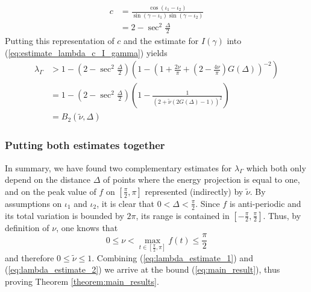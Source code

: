 \documentclass{article}
\begin{document}
\begin{align*}
    c &=  \frac{\cos(\iota_1-\iota_2)}{\sin(\gamma - \iota_1) \sin(\gamma - \iota_2)}\\
    &= 2 - \sec^2 \frac\Delta 2
\end{align*}
Putting this representation of $c$ and the estimate for $I(\gamma)$ into (\ref{eq:estimate_lambda_c_I_gamma}) yields
\begin{align}
    \lambda_\Gamma &> 1 -  \left(2 - \sec^2 \frac\Delta 2\right)\left( 1-\left(1+ \frac{2\nu}\pi+ \left(2 - \frac{4\nu}\pi\right) G(\Delta)\right)^{-2}\right)\nonumber\\
    &= 1 -  \left(2 - \sec^2 \frac\Delta 2\right)\left( 1-\frac{1}{\left(2+\tilde\nu (2G(\Delta)-1)\right)^{2}}\right) \label{eq:lambda_estimate_2}\\
     &= B_2(\tilde\nu, \Delta) \nonumber
\end{align}

\subsubsection*{Putting both estimates together}

In summary, we have found two complementary estimates for $\lambda_\Gamma$ which both only depend on the distance $\Delta$ of points where the energy projection is equal to one, and on the peak value of $f$ on $[\frac\pi2,\pi]$ represented (indirectly) by $\tilde\nu$.
By assumptions on $\iota_1$ and $\iota_2$, it is clear that $0<\Delta<\frac\pi2$.
Since $f$ is anti-periodic and its total variation is bounded by $2\pi$, its range is contained in $[-\frac\pi2,\frac\pi2]$. Thus, by definition of $\nu$, one knows that
\[0 \le \nu < \max_{t\in[\frac{\pi}{2},\pi]} f(t) \le \frac\pi2\]
and therefore $0 \le \tilde\nu \le 1$.
Combining (\ref{eq:lambda_estimate_1}) and (\ref{eq:lambda_estimate_2}) we arrive at the bound (\ref{eq:main_result}), thus proving Theorem \ref{theorem:main_results}.
\end{document}
